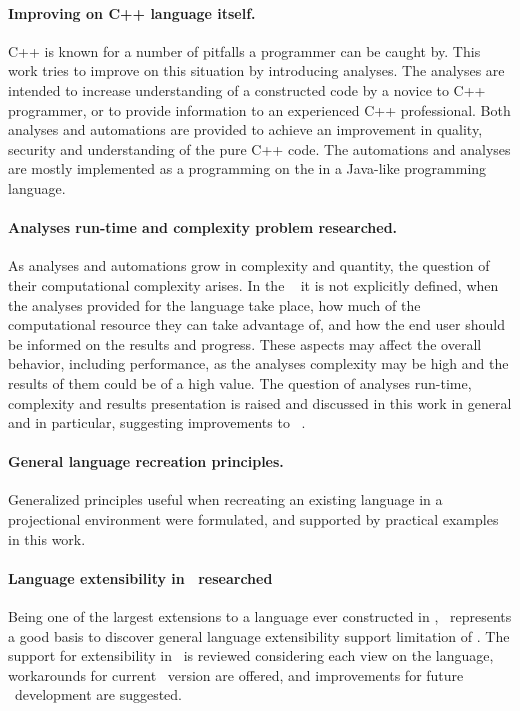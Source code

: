  \paragraph{Improving on C++ language itself.} C++ is known for a number of pitfalls a programmer can be caught by. This work tries to improve on this situation by introducing analyses.
The analyses are intended to increase understanding of a constructed code by a novice to C++ programmer, 
or to provide information to an experienced C++ professional. Both analyses and automations are provided to 
achieve an improvement in quality, security and understanding of the pure C++ code. The automations and analyses 
are mostly implemented as a programming on the  in a Java-like programming language.

 \paragraph{Analyses run-time and complexity problem researched.} As analyses and automations grow in complexity and quantity, the question of their computational complexity arises.
In the \jbmps\  it is not explicitly defined, when the analyses provided for the language take place, 
how much of the computational resource they can take advantage of, and how the end user should be informed on the results and progress. 
These aspects may affect the overall  behavior, including performance, as the analyses complexity may be high and the results of them could 
be of a high value. The question of analyses run-time, complexity and results presentation is raised and discussed in 
this work in general and in particular, suggesting improvements to \jbmps\ .

 \paragraph{General language recreation principles.} Generalized principles useful when recreating an existing language in a projectional environment were 
 formulated, and supported by practical examples in this work.
 
 \paragraph{Language extensibility in \jbmps\ researched} Being one of the largest extensions to a language ever constructed in \jbmps, \pcpp\ 
 represents a good basis to discover general language extensibility support limitation of \jbmps. The support for extensibility in \jbmps\ is 
 reviewed considering each view on the language, workarounds for current \jbmps\ version are offered, and improvements for future \jbmps\ development
 are suggested.
 
